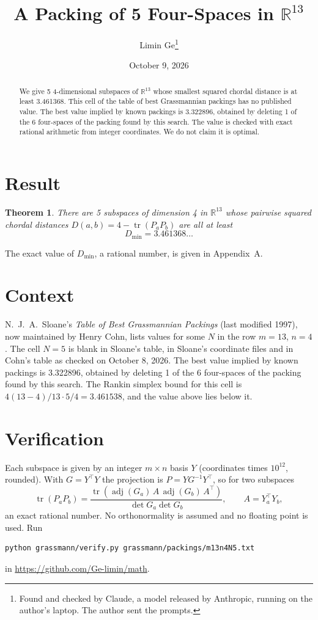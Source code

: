 \documentclass[11pt,a4paper]{article}
\title{A Packing of 5 Four-Spaces in $\mathbb{R}^{13}$}
\author{Limin Ge\thanks{Found and checked by Claude, a model released by Anthropic, running on the author's laptop. The author sent the prompts.}}
\date{October 9, 2026}
\newtheorem*{theorem}{Theorem}
\begin{document}
\maketitle
\begin{abstract}
We give 5 4-dimensional subspaces of $\mathbb{R}^{13}$ whose smallest squared chordal distance is at least 3.461368. This cell of the table of best Grassmannian packings has no published value. The best value implied by known packings is 3.322896, obtained by deleting 1 of the 6 four-spaces of the packing found by this search. The value is checked with exact rational arithmetic from integer coordinates. We do not claim it is optimal.
\end{abstract}

\section{Result}
\begin{theorem}
There are 5 subspaces of dimension 4 in $\mathbb{R}^{13}$ whose pairwise squared chordal distances $D(a,b) = 4 - \operatorname{tr}(P_aP_b)$ are all at least
\[ D_{\min} = 3.461368\ldots \]
\end{theorem}
The exact value of $D_{\min}$, a rational number, is given in Appendix~A.


\section{Context}
N.~J.~A.~Sloane's \emph{Table of Best Grassmannian Packings} (last modified 1997), now maintained by Henry Cohn, lists values for some $N$ in the row $m=13$, $n=4$. The cell $N=5$ is blank in Sloane's table, in Sloane's coordinate files and in Cohn's table as checked on October 8, 2026. The best value implied by known packings is 3.322896, obtained by deleting 1 of the 6 four-spaces of the packing found by this search. The Rankin simplex bound for this cell is $4(13-4)/13\cdot 5/4 = 3.461538$, and the value above lies below it.


\section{Verification}
Each subspace is given by an integer $m\times n$ basis $Y$ (coordinates times $10^{12}$, rounded). With $G=Y^\top Y$ the projection is $P=YG^{-1}Y^\top$, so for two subspaces
\[ \operatorname{tr}(P_aP_b)=\frac{\operatorname{tr}(\operatorname{adj}(G_a)\,A\,\operatorname{adj}(G_b)\,A^\top)}{\det G_a\det G_b},\qquad A=Y_a^\top Y_b, \]
an exact rational number. No orthonormality is assumed and no floating point is used. Run
\begin{verbatim}
python grassmann/verify.py grassmann/packings/m13n4N5.txt
\end{verbatim}
in \url{https://github.com/Ge-limin/math}.
\end{document}
